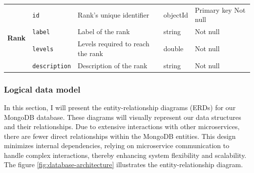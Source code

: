 \begin{landscape}
\begin{longtable}{ | m{} | m{} | m{} | m{} | m{} | }
        \hline
        \multirow[t]{4}{5em}{\textbf{Rank}}                              & \texttt{id}                               & Rank's unique identifier                                             & objectId      & Primary key \newline Not null \\
        \cline{2-5}
                                                                         & \texttt{label}                            & Label of the rank                                                    & string        & Not null                      \\
        \cline{2-5}
                                                                         & \texttt{levels}                           & Levels required to reach the rank                                    & double        & Not null                      \\
        \cline{2-5}
                                                                         & \texttt{description}                      & Description of the rank                                              & string        & Not null                      \\
        \hline
    \end{longtable}
\end{landscape}

\subsubsection{Logical data model}
In this section, I will present the entity-relationship diagrams (ERDs) for our MongoDB database. These diagrams will visually represent our data structures and their relationships. Due to extensive interactions with other microservices, there are fewer direct relationships within the MongoDB entities. This design minimizes internal dependencies, relying on microservice communication to handle complex interactions, thereby enhancing system flexibility and scalability.
\noindent The figure \ref{fig:database-architecture} illustrates the entity-relationship diagram.

